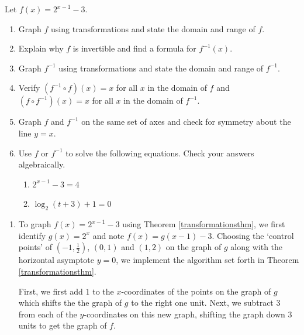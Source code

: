 \documentclass{ximera}
\begin{document}
\begin{example}  Let $f(x) = 2^{x-1} - 3$. \label{proceduralinverse}

\begin{enumerate}

\item  Graph $f$ using transformations and state the domain and range of $f$.

\item  Explain why $f$ is invertible and find a formula for $f^{-1}(x)$.

\item  Graph $f^{-1}$ using transformations and state the domain and range of $f^{-1}$.

\item  Verify $\left(f^{-1} \circ f\right)(x) = x$ for all $x$ in the domain of $f$ and  $\left(f \circ f^{-1} \right)(x) = x$ for all $x$ in the domain of $f^{-1}$.

\item  Graph $f$ and $f^{-1}$ on the same set of axes and check for symmetry about the line $y = x$.

\item  Use $f$ or $f^{-1}$ to solve the following equations.  Check your answers algebraically.

\begin{enumerate}

\item  $2^{x-1} - 3 = 4$

\item  $\log_{2}(t+3)+1 = 0$

\end{enumerate}

\end{enumerate}

\begin{explanation}

\begin{enumerate}

\item   To graph $f(x) = 2^{x-1} - 3$ using  Theorem \ref{transformationsthm}, we first identify $g(x) = 2^{x}$ and note  $f(x) = g(x-1)-3$.  Choosing the `control points' of  $\left(-1, \frac{1}{2}\right)$, $(0,1)$ and $(1, 2)$ on the graph of $g$ along with the horizontal asymptote $y=0$, we implement the algorithm set forth in Theorem \ref{transformationsthm}.  


First, we first add $1$ to the $x$-coordinates of the points on the graph of $g$ which shifts the the graph of $g$ to the right one unit.   Next, we subtract $3$ from each of the $y$-coordinates on this new graph, shifting the graph down $3$ units to get the graph of $f$.



\end{enumerate}
\end{explanation}
\end{example}
\end{document}
